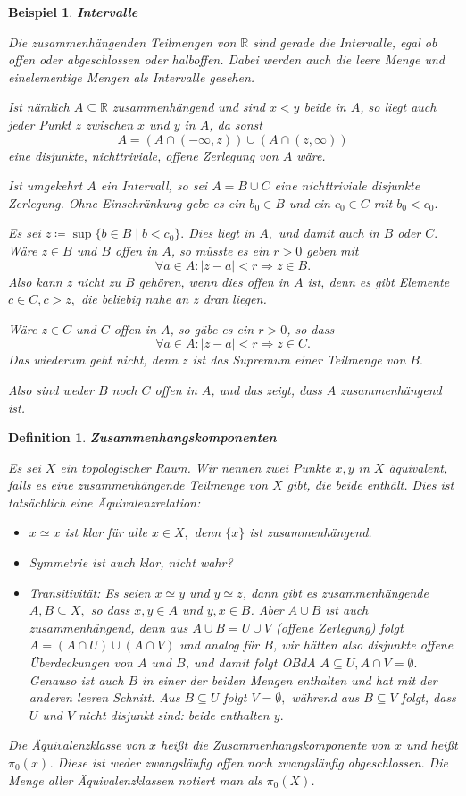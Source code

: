 \documentclass[12pt]{scrbook}   %
\newtheorem{definiX}[alles]{Definition}
\newenvironment{defini}[1]{\begin{definiX}{\bf #1}\par\rm}{\end{definiX}}
\newtheorem{bspX}[alles]{Beispiel}
\newenvironment{bsp}[1]{\begin{bspX}{\bf #1}\par\rm}{\end{bspX}}
\newcommand{\da}{\coloneqq}
\begin{document}
\begin{bsp}{Intervalle}
Die zusammenhängenden Teilmengen von $\mathbb R$ sind gerade die 
Intervalle, egal ob offen oder abgeschlossen oder halboffen. Dabei werden auch 
die leere Menge und einelementige Mengen als Intervalle gesehen.

Ist nämlich $A\subseteq \mathbb R$ zusammenhängend und sind 
$x<y$ beide in $A$, so liegt auch jeder Punkt $z$ zwischen $x$ und $y$ in $A$,
da sonst 
$$A = (A\cap(-\infty,z)) \cup (A\cap (z,\infty))$$
eine disjunkte, nichttriviale, offene Zerlegung von $A$ wäre.

Ist umgekehrt $A$ ein Intervall, so sei $A=B\cup C$ eine nichttriviale
disjunkte Zerlegung. Ohne Einschränkung gebe es ein $b_0\in B$ und ein 
$c_0\in C$ mit $b_0<c_0.$ 

Es sei $z\da \sup\{b\in B\mid b<c_0\}.$ Dies liegt in $A,$ und damit auch in 
$B$ oder $C.$ Wäre $z\in B$ und $B$ offen in $A$, so müsste es ein $r>0$ 
geben mit
$$\forall a\in A: |z-a| < r \Rightarrow z\in B.$$
Also kann $z$ nicht zu $B$ gehören, wenn dies offen in $A$ ist, denn es gibt 
Elemente $c\in C, c>z,$ die beliebig nahe an $z$ dran liegen. 

Wäre $z\in C$ und $C$ offen in $A$, so gäbe es ein $r>0$, so dass
$$\forall a\in A: |z-a| < r \Rightarrow z\in C.$$
Das wiederum geht nicht, denn $z$ ist das Supremum einer Teilmenge von $B.$

Also sind weder $B$ noch $C$ offen in $A$, und das zeigt, dass $A$ 
zusammenhängend ist.

\end{bsp}

\begin{defini}{Zusammenhangskomponenten}
Es sei $X$ ein topologischer Raum. Wir nennen zwei Punkte $x,y$ in $X$
{\it äquivalent}, falls es eine zusammenhängende Teilmenge von $X$ gibt, 
die beide enthält. Dies ist tatsächlich eine Äquivalenzrelation:
\begin{itemize}
\item $x\simeq x$ ist klar für alle $x\in X,$ denn $\{x\}$ ist 
zusammenhängend. 
\item Symmetrie ist auch klar, nicht wahr?
\item Transitivität: Es seien $x\simeq y$ und $y\simeq z$, dann gibt es 
zusammenhängende $A,B\subseteq X,$ so dass $x,y\in A$ und $y,x\in B$. 
Aber $A\cup B$ ist auch zusammenhängend, denn aus $A\cup B = U\cup V$ (offene
Zerlegung) folgt
$A=(A\cap U) \cup (A\cap V)$ und analog für $B$, wir hätten also 
disjunkte offene Überdeckungen von $A$ und $B$, und damit folgt OBdA 
$A\subseteq U, A\cap V = \emptyset.$ Genauso ist auch $B$ in einer der beiden 
Mengen enthalten und hat mit der anderen leeren Schnitt. Aus 
$B\subseteq U$ folgt $V=\emptyset,$ während aus $B\subseteq V$ folgt, dass
$U$ und $V$ nicht disjunkt sind: beide enthalten $y.$
\end{itemize}
Die Äquivalenzklasse von $x$ heißt die {\it Zusammenhangskomponente} von 
$x$ und heißt $\pi_0(x)$. Diese ist weder zwangsläufig offen noch zwangsläufig abgeschlossen. Die Menge aller Äquivalenzklassen notiert man als $\pi_0(X)$.
\end{defini}
\end{document}
